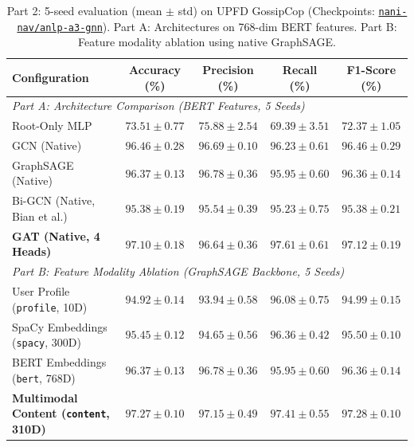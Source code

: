\documentclass[12pt,a4paper]{article}
\begin{document}
\begin{table}[h]
\centering
\footnotesize
\setlength{\tabcolsep}{5pt}
\caption{Part 2: 5-seed evaluation (mean $\pm$ std) on UPFD GossipCop (Checkpoints: \href{https://huggingface.co/nani-nav/anlp-a3-gnn}{\texttt{nani-nav/anlp-a3-gnn}}). Part A: Architectures on 768-dim BERT features. Part B: Feature modality ablation using native GraphSAGE.}
\label{tab:part2_results}
\begin{tabular}{lcccc}
\toprule
\textbf{Configuration} & \textbf{Accuracy (\%)} & \textbf{Precision (\%)} & \textbf{Recall (\%)} & \textbf{F1-Score (\%)} \\
\midrule
\multicolumn{5}{l}{\textit{Part A: Architecture Comparison (BERT Features, 5 Seeds)}} \\
Root-Only MLP & $73.51 \pm 0.77$ & $75.88 \pm 2.54$ & $69.39 \pm 3.51$ & $72.37 \pm 1.05$ \\
GCN (Native) & $96.46 \pm 0.28$ & $96.69 \pm 0.10$ & $96.23 \pm 0.61$ & $96.46 \pm 0.29$ \\
GraphSAGE (Native) & $96.37 \pm 0.13$ & $\mathbf{96.78 \pm 0.36}$ & $95.95 \pm 0.60$ & $96.36 \pm 0.14$ \\
Bi-GCN (Native, Bian et al.) & $95.38 \pm 0.19$ & $95.54 \pm 0.39$ & $95.23 \pm 0.75$ & $95.38 \pm 0.21$ \\
\textbf{GAT (Native, 4 Heads)} & $\mathbf{97.10 \pm 0.18}$ & $96.64 \pm 0.36$ & $\mathbf{97.61 \pm 0.61}$ & $\mathbf{97.12 \pm 0.19}$ \\
\midrule
\multicolumn{5}{l}{\textit{Part B: Feature Modality Ablation (GraphSAGE Backbone, 5 Seeds)}} \\
User Profile (\texttt{profile}, 10D) & $94.92 \pm 0.14$ & $93.94 \pm 0.58$ & $96.08 \pm 0.75$ & $94.99 \pm 0.15$ \\
SpaCy Embeddings (\texttt{spacy}, 300D) & $95.45 \pm 0.12$ & $94.65 \pm 0.56$ & $96.36 \pm 0.42$ & $95.50 \pm 0.10$ \\
BERT Embeddings (\texttt{bert}, 768D) & $96.37 \pm 0.13$ & $96.78 \pm 0.36$ & $95.95 \pm 0.60$ & $96.36 \pm 0.14$ \\
\textbf{Multimodal Content (\texttt{content}, 310D)} & $\mathbf{97.27 \pm 0.10}$ & $\mathbf{97.15 \pm 0.49}$ & $\mathbf{97.41 \pm 0.55}$ & $\mathbf{97.28 \pm 0.10}$ \\
\bottomrule
\end{tabular}
\end{table}
\end{document}
